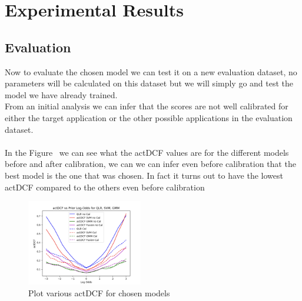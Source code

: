 \documentclass{article}
\begin{document}
\section{Experimental Results}
\subsection{Evaluation}
Now to evaluate the chosen model we can test it on a new evaluation dataset, no parameters will be calculated on this dataset but we will simply go and test the model we have already trained.\\
From an initial analysis we can infer that the scores are not well calibrated for either the target application or the other possible applications in the evaluation dataset.\\\\
In the Figure~ we can see what the actDCF values are for the different models before and after calibration, we can we can infer even before calibration that the best model is the one that was chosen. In fact it turns out to have the lowest actDCF compared to the others even before calibration
\begin{figure}[H]
    \centering
    \includegraphics[width=0.45\textwidth]{./img/PlotActDCF.png}
    \caption{Plot various actDCF for chosen models}
    \label{fig:Act}
\end{figure} 
\end{document}
